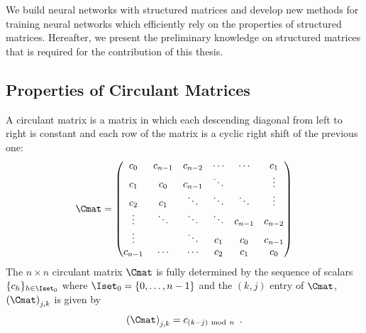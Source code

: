


We build neural networks with structured matrices and develop new methods for training neural networks which efficiently rely on the properties of structured matrices. 
Hereafter, we present the preliminary knowledge on structured matrices that is required for the contribution of this thesis. 


\subsection{Properties of Circulant Matrices}
\label{subsection:ch2-properties_of_circulant_matrices}

A circulant matrix is a matrix in which each descending diagonal from left to right is constant and each row of the matrix is a cyclic right shift of the previous one:
\begin{equation}
  \Cmat =
  \leftmatrix
    c_0 & c_{n-1} & c_{n-2} & \cdots & \cdots & c_{1} \\
    c_{1} & c_0 & c_{n-1} & \ddots & & \vdots \\
    c_{2} & c_{1} & \ddots & \ddots & \ddots & \vdots \\
    \vdots & \ddots & \ddots & \ddots & c_{n-1} & c_{n-2} \\
    \vdots & & \ddots & c_{1} & c_{0} & c_{n-1} \\
    c_{n-1} & \cdots & \cdots & c_{2} & c_{1} & c_0
  \rightmatrix
\end{equation}
\noindent
The $n \times n$ circulant matrix $\Cmat$ is fully determined by the sequence of scalars $\{c_h\}_{h \in \Iset_0}$ where $\Iset_0 = \{0, \ldots, n-1\}$ and the $(k,j)$ entry of $\Cmat$, $\leftmat \Cmat \rightmat_{j,k}$ is given by
\begin{equation}
  \leftmat \Cmat \rightmat_{j,k} = c_{\left(k-j\right) \mod n} \enspace.
\end{equation}



